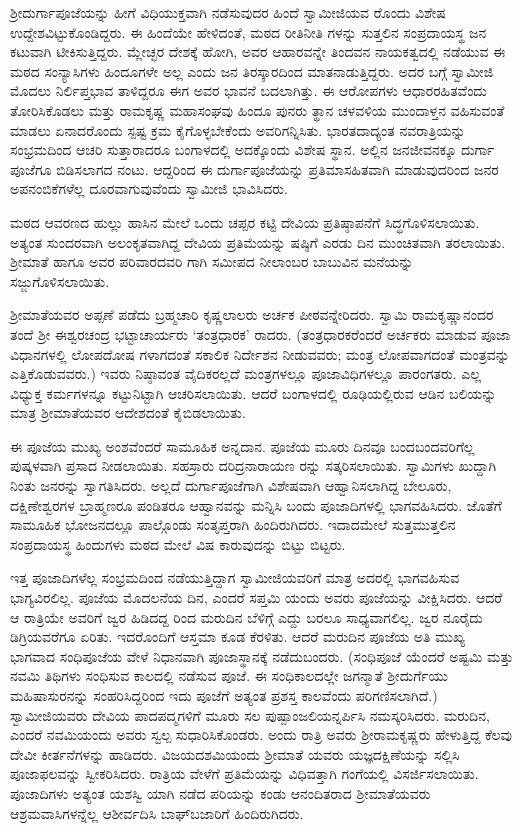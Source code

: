 ಶ್ರೀದುರ್ಗಾಪೂಜೆಯನ್ನು ಹೀಗೆ ವಿಧಿಯುಕ್ತವಾಗಿ ನಡೆಸುವುದರ ಹಿಂದೆ ಸ್ವಾಮೀಜಿಯವ ರೊಂದು ವಿಶೇಷ ಉದ್ದೇಶವಿಟ್ಟುಕೊಂಡಿದ್ದರು. ಈ ಹಿಂದೆಯೇ ಹೇಳಿದಂತೆ, ಮಠದ ರೀತಿನೀತಿ ಗಳನ್ನು ಸುತ್ತಲಿನ ಸಂಪ್ರದಾಯಸ್ಥ ಜನ ಕಟುವಾಗಿ ಟೀಕಿಸುತ್ತಿದ್ದರು. ಮ್ಲೇಚ್ಛರ ದೇಶಕ್ಕೆ ಹೋಗಿ, ಅವರ ಆಹಾರವನ್ನೇ ತಿಂದವನ ನಾಯಕತ್ವದಲ್ಲಿ ನಡೆಯುವ ಈ ಮಠದ ಸಂನ್ಯಾಸಿಗಳು ಹಿಂದೂಗಳೇ ಅಲ್ಲ ಎಂದು ಜನ ತಿರಸ್ಕಾರದಿಂದ ಮಾತನಾಡುತ್ತಿದ್ದರು. ಅದರ ಬಗ್ಗೆ ಸ್ವಾಮೀಜಿ ಮೊದಲು ನಿರ್ಲಿಪ್ತಭಾವ ತಾಳಿದ್ದರೂ ಈಗ ಅವರ ಭಾವನೆ ಬದಲಾಗಿತ್ತು. ಈ ಆರೋಪಗಳು ಆಧಾರರಹಿತವೆಂದು ತೋರಿಸಿಕೊಡಲು ಮತ್ತು ರಾಮಕೃಷ್ಣ ಮಹಾಸಂಘವು ಹಿಂದೂ ಪುನರು ತ್ಥಾನ ಚಳವಳಿಯ ಮುಂದಾಳ್ತನ ವಹಿಸುವಂತೆ ಮಾಡಲು ಏನಾದರೊಂದು ಸ್ಪಷ್ಟ ಕ್ರಮ ಕೈಗೊಳ್ಳಬೇಕೆಂದು ಅವರಿಗನ್ನಿಸಿತು. ಭಾರತದಾದ್ಯಂತ ನವರಾತ್ರಿಯನ್ನು ಸಂಭ್ರಮದಿಂದ ಆಚರಿ ಸುತ್ತಾರಾದರೂ ಬಂಗಾಳದಲ್ಲಿ ಅದಕ್ಕೊಂದು ವಿಶೇಷ ಸ್ಥಾನ. ಅಲ್ಲಿನ ಜನಜೀವನಕ್ಕೂ ದುರ್ಗಾ ಪೂಜೆಗೂ ಬಿಡಿಸಲಾಗದ ನಂಟು. ಆದ್ದರಿಂದ ಈ ದುರ್ಗಾಪೂಜೆಯನ್ನು ಪ್ರತಿಮಾಸಹಿತವಾಗಿ ಮಾಡುವುದರಿಂದ ಜನರ ಅಪನಂಬಿಕೆಗಳೆಲ್ಲ ದೂರವಾಗುವುವೆಂದು ಸ್ವಾಮೀಜಿ ಭಾವಿಸಿದರು.

ಮಠದ ಆವರಣದ ಹುಲ್ಲು ಹಾಸಿನ ಮೇಲೆ ಒಂದು ಚಪ್ಪರ ಕಟ್ಟಿ ದೇವಿಯ ಪ್ರತಿಷ್ಠಾಪನೆಗೆ ಸಿದ್ಧಗೊಳಿಸಲಾಯಿತು. ಅತ್ಯಂತ ಸುಂದರವಾಗಿ ಅಲಂಕೃತವಾಗಿದ್ದ ದೇವಿಯ ಪ್ರತಿಮೆಯನ್ನು ಷಷ್ಠಿಗೆ ಎರಡು ದಿನ ಮುಂಚಿತವಾಗಿ ತರಲಾಯಿತು. ಶ್ರೀಮಾತೆ ಹಾಗೂ ಅವರ ಪರಿವಾರದವರಿ ಗಾಗಿ ಸಮೀಪದ ನೀಲಾಂಬರ ಬಾಬುವಿನ ಮನೆಯನ್ನು ಸಜ್ಜುಗೊಳಿಸಲಾಯಿತು.

ಶ್ರೀಮಾತೆಯವರ ಅಪ್ಪಣೆ ಪಡೆದು ಬ್ರಹ್ಮಚಾರಿ ಕೃಷ್ಣಲಾಲರು ಅರ್ಚಕ ಪೀಠವನ್ನೇರಿದರು. ಸ್ವಾಮಿ ರಾಮಕೃಷ್ಣಾನಂದರ ತಂದೆ ಶ್ರೀ ಈಶ್ವರಚಂದ್ರ ಭಟ್ಟಾಚಾರ್ಯರು ‘ತಂತ್ರಧಾರಕ’ ರಾದರು. (ತಂತ್ರಧಾರಕರೆಂದರೆ ಅರ್ಚಕರು ಮಾಡುವ ಪೂಜಾ ವಿಧಾನಗಳಲ್ಲಿ ಲೋಪದೋಷ ಗಳಾಗದಂತೆ ಸಕಾಲಿಕ ನಿರ್ದೇಶನ ನೀಡುವವರು; ಮಂತ್ರ ಲೋಪವಾಗದಂತೆ ಮಂತ್ರವನ್ನು ಎತ್ತಿಕೊಡುವವರು.) ಇವರು ನಿಷ್ಠಾವಂತ ವೈದಿಕರಲ್ಲದೆ ಮಂತ್ರಗಳಲ್ಲೂ ಪೂಜಾವಿಧಿಗಳಲ್ಲೂ ಪಾರಂಗತರು. ಎಲ್ಲ ವಿಧ್ಯುಕ್ತ ಕರ್ಮಗಳನ್ನೂ ಕಟ್ಟುನಿಟ್ಟಾಗಿ ಆಚರಿಸಲಾಯಿತು. ಆದರೆ ಬಂಗಾಳದಲ್ಲಿ ರೂಢಿಯಲ್ಲಿರುವ ಆಡಿನ ಬಲಿಯನ್ನು ಮಾತ್ರ ಶ್ರೀಮಾತೆಯವರ ಆದೇಶದಂತೆ ಕೈಬಿಡಲಾಯಿತು.

ಈ ಪೂಜೆಯ ಮುಖ್ಯ ಅಂಶವೆಂದರೆ ಸಾಮೂಹಿಕ ಅನ್ನದಾನ. ಪೂಜೆಯ ಮೂರು ದಿನವೂ ಬಂದಬಂದವರಿಗೆಲ್ಲ ಪುಷ್ಕಳವಾಗಿ ಪ್ರಸಾದ ನೀಡಲಾಯಿತು. ಸಹಸ್ರಾರು ದರಿದ್ರನಾರಾಯಣ ರನ್ನು ಸತ್ಕರಿಸಲಾಯಿತು. ಸ್ವಾಮಿಗಳು ಖುದ್ದಾಗಿ ನಿಂತು ಜನರನ್ನು ಸ್ವಾಗತಿಸಿದರು. ಅಲ್ಲದೆ ದುರ್ಗಾಪೂಜೆಗಾಗಿ ವಿಶೇಷವಾಗಿ ಆಹ್ವಾನಿಸಲಾಗಿದ್ದ ಬೇಲೂರು, ದಕ್ಷಿಣೇಶ್ವರಗಳ ಬ್ರಾಹ್ಮಣರೂ ಪಂಡಿತರೂ ಆಹ್ವಾನವನ್ನು ಮನ್ನಿಸಿ ಬಂದು ಪೂಜಾದಿಗಳಲ್ಲಿ ಭಾಗವಹಿಸಿದರು. ಜೊತೆಗೆ ಸಾಮೂಹಿಕ ಭೋಜನದಲ್ಲೂ ಪಾಲ್ಗೊಂಡು ಸಂತೃಪ್ತರಾಗಿ ಹಿಂದಿರುಗಿದರು. ಇದಾದಮೇಲೆ ಸುತ್ತಮುತ್ತಲಿನ ಸಂಪ್ರದಾಯಸ್ಥ ಹಿಂದುಗಳು ಮಠದ ಮೇಲೆ ವಿಷ ಕಾರುವುದನ್ನು ಬಿಟ್ಟು ಬಿಟ್ಟರು.

ಇತ್ತ ಪೂಜಾದಿಗಳೆಲ್ಲ ಸಂಭ್ರಮದಿಂದ ನಡೆಯುತ್ತಿದ್ದಾಗ ಸ್ವಾಮೀಜಿಯವರಿಗೆ ಮಾತ್ರ ಅದರಲ್ಲಿ ಭಾಗವಹಿಸುವ ಭಾಗ್ಯವಿರಲಿಲ್ಲ. ಪೂಜೆಯ ಮೊದಲನೆಯ ದಿನ, ಎಂದರೆ ಸಪ್ತಮಿ ಯಂದು ಅವರು ಪೂಜೆಯನ್ನು ವೀಕ್ಷಿಸಿದರು. ಆದರೆ ಆ ರಾತ್ರಿಯೇ ಅವರಿಗೆ ಜ್ವರ ಹಿಡಿದದ್ದ ರಿಂದ ಮರುದಿನ ಬೆಳಿಗ್ಗೆ ಎದ್ದು ಬರಲೂ ಸಾಧ್ಯವಾಗಲಿಲ್ಲ. ಜ್ವರ ನೂರೈದು ಡಿಗ್ರಿಯವರೆಗೂ ಏರಿತು. ಇದರೊಂದಿಗೆ ಆಸ್ತಮಾ ಕೂಡ ಕೆರಳಿತು. ಆದರೆ ಮರುದಿನ ಪೂಜೆಯ ಅತಿ ಮುಖ್ಯ ಭಾಗವಾದ ಸಂಧಿಪೂಜೆಯ ವೇಳೆ ನಿಧಾನವಾಗಿ ಪೂಜಾಸ್ಥಾನಕ್ಕೆ ನಡೆದುಬಂದರು. (ಸಂಧಿಪೂಜೆ ಯೆಂದರೆ ಅಷ್ಟಮಿ ಮತ್ತು ನವಮಿ ತಿಥಿಗಳು ಸಂಧಿಸುವ ಕಾಲದಲ್ಲಿ ನಡೆಸುವ ಪೂಜೆ. ಈ ಸಂಧಿಕಾಲದಲ್ಲೇ ಜಗನ್ಮಾತೆ ಶ್ರೀದುರ್ಗೆಯು ಮಹಿಷಾಸುರನನ್ನು ಸಂಹರಿಸಿದ್ದರಿಂದ ಇದು ಪೂಜೆಗೆ ಅತ್ಯಂತ ಪ್ರಶಸ್ತ ಕಾಲವೆಂದು ಪರಿಗಣಿಸಲಾಗಿದೆ.) ಸ್ವಾಮೀಜಿಯವರು ದೇವಿಯ ಪಾದಪದ್ಮಗಳಿಗೆ ಮೂರು ಸಲ ಪುಷ್ಪಾಂಜಲಿಯನ್ನರ್ಪಿಸಿ ನಮಸ್ಕರಿಸಿದರು. ಮರುದಿನ, ಎಂದರೆ ನವಮಿಯಂದು ಅವರು ಸ್ವಲ್ಪ ಸುಧಾರಿಸಿಕೊಂಡರು. ಅಂದು ರಾತ್ರಿ ಅವರು ಶ್ರೀರಾಮಕೃಷ್ಣರು ಹೇಳುತ್ತಿದ್ದ ಕೆಲವು ದೇವೀ ಕೀರ್ತನೆಗಳನ್ನು ಹಾಡಿದರು. ವಿಜಯದಶಮಿಯಂದು ಶ್ರೀಮಾತೆ ಯವರು ಯಜ್ಞದಕ್ಷಿಣೆಯನ್ನು ಸಲ್ಲಿಸಿ ಪೂಜಾಫಲವನ್ನು ಸ್ವೀಕರಿಸಿದರು. ರಾತ್ರಿಯ ವೇಳೆಗೆ ಪ್ರತಿಮೆಯನ್ನು ವಿಧಿವತ್ತಾಗಿ ಗಂಗೆಯಲ್ಲಿ ವಿಸರ್ಜಿಸಲಾಯಿತು. ಪೂಜಾದಿಗಳು ಅತ್ಯಂತ ಯಶಸ್ವಿ ಯಾಗಿ ನಡೆದ ಪರಿಯನ್ನು ಕಂಡು ಆನಂದಿತರಾದ ಶ್ರೀಮಾತೆಯವರು ಆಶ್ರಮವಾಸಿಗಳನ್ನೆಲ್ಲ ಆಶೀರ್ವದಿಸಿ ಬಾಘ್​ಬಜಾರಿಗೆ ಹಿಂದಿರುಗಿದರು.

